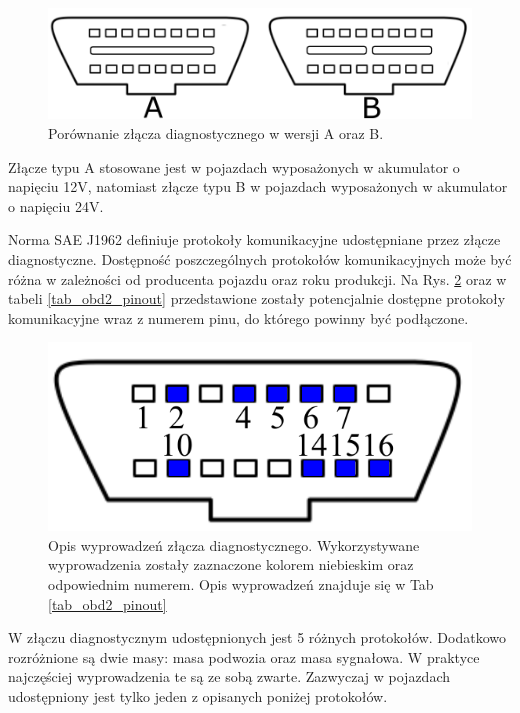 \documentclass[12pt, twoside]{article} %
\numberwithin{equation}{subsection}
\numberwithin{figure}{section}
\numberwithin{table}{section}
\begin{document}
		\begin{figure}[ht]
		\centering
		\includegraphics[scale=0.8]{Images/ZlaczaOBD2.pdf}
		\caption{Porównanie złącza diagnostycznego w wersji A oraz B.}
		\label{rys_obd2_wtyczka}
		\end{figure}
		
		Złącze typu A stosowane jest w pojazdach wyposażonych w akumulator o napięciu 12V, natomiast złącze typu B w pojazdach wyposażonych w akumulator o napięciu 24V.
		
		Norma SAE J1962 definiuje protokoły komunikacyjne udostępniane przez złącze diagnostyczne. Dostępność poszczególnych protokołów komunikacyjnych może być różna w zależności od producenta pojazdu oraz roku produkcji. Na Rys. \ref{rys_obd2_pinout} oraz w tabeli \ref{tab_obd2_pinout} przedstawione zostały potencjalnie dostępne protokoły komunikacyjne wraz z numerem pinu, do którego powinny być podłączone.
		
		\begin{figure}[ht]
		\centering
		\includegraphics[scale=0.8]{Images/ZlaczeOBD2_pinout.pdf}
		\caption{Opis wyprowadzeń złącza diagnostycznego. Wykorzystywane wyprowadzenia zostały zaznaczone kolorem niebieskim oraz odpowiednim numerem. Opis wyprowadzeń znajduje się w Tab \ref{tab_obd2_pinout}}
		\label{rys_obd2_pinout}
		\end{figure}
		
		W złączu diagnostycznym udostępnionych jest 5 różnych protokołów. Dodatkowo rozróżnione są dwie masy: masa podwozia oraz masa sygnałowa. W praktyce najczęściej wyprowadzenia te są ze sobą zwarte. Zazwyczaj w pojazdach udostępniony jest tylko jeden z opisanych poniżej protokołów. 
		
\end{document}
